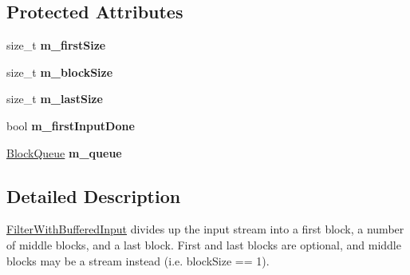 \subsection*{Protected Attributes}
\begin{DoxyCompactItemize}
\item 
\hypertarget{class_filter_with_buffered_input_ad36fd2f842972df8aa3090dd842f05df}{
size\_\-t {\bfseries m\_\-firstSize}}
\label{class_filter_with_buffered_input_ad36fd2f842972df8aa3090dd842f05df}

\item 
\hypertarget{class_filter_with_buffered_input_a2ceeb805741b1d18c31eef766f119bd6}{
size\_\-t {\bfseries m\_\-blockSize}}
\label{class_filter_with_buffered_input_a2ceeb805741b1d18c31eef766f119bd6}

\item 
\hypertarget{class_filter_with_buffered_input_acbbf7dbac7f888b359c59c0885c3e1f4}{
size\_\-t {\bfseries m\_\-lastSize}}
\label{class_filter_with_buffered_input_acbbf7dbac7f888b359c59c0885c3e1f4}

\item 
\hypertarget{class_filter_with_buffered_input_a5ea353eb2ad9b840135ccd50ffafb53d}{
bool {\bfseries m\_\-firstInputDone}}
\label{class_filter_with_buffered_input_a5ea353eb2ad9b840135ccd50ffafb53d}

\item 
\hypertarget{class_filter_with_buffered_input_a247747a0f1857454d9c786003b5f4c3d}{
\hyperlink{class_filter_with_buffered_input_1_1_block_queue}{BlockQueue} {\bfseries m\_\-queue}}
\label{class_filter_with_buffered_input_a247747a0f1857454d9c786003b5f4c3d}

\end{DoxyCompactItemize}


\subsection{Detailed Description}
\hyperlink{class_filter_with_buffered_input}{FilterWithBufferedInput} divides up the input stream into a first block, a number of middle blocks, and a last block. First and last blocks are optional, and middle blocks may be a stream instead (i.e. blockSize == 1). 

